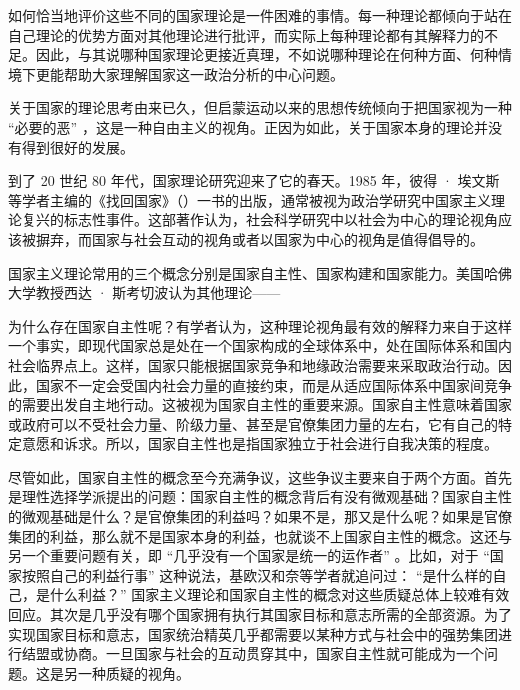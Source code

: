 如何恰当地评价这些不同的国家理论是一件困难的事情。每一种理论都倾向于站在自己理论的优势方面对其他理论进行批评，而实际上每种理论都有其解释力的不足。因此，与其说哪种国家理论更接近真理，不如说哪种理论在何种方面、何种情境下更能帮助大家理解国家这一政治分析的中心问题。


关于国家的理论思考由来已久，但启蒙运动以来的思想传统倾向于把国家视为一种 “必要的恶” ，这是一种自由主义的视角。正因为如此，关于国家本身的理论并没有得到很好的发展。

到了 20 世纪 80 年代，国家理论研究迎来了它的春天。1985 年，彼得 · 埃文斯等学者主编的《找回国家》（）一书的出版，通常被视为政治学研究中国家主义理论复兴的标志性事件。这部著作认为，社会科学研究中以社会为中心的理论视角应该被摒弃，而国家与社会互动的视角或者以国家为中心的视角是值得倡导的。

国家主义理论常用的三个概念分别是国家自主性、国家构建和国家能力。美国哈佛大学教授西达 · 斯考切波认为其他理论——


为什么存在国家自主性呢？有学者认为，这种理论视角最有效的解释力来自于这样一个事实，即现代国家总是处在一个国家构成的全球体系中，处在国际体系和国内社会临界点上。这样，国家只能根据国家竞争和地缘政治需要来采取政治行动。因此，国家不一定会受国内社会力量的直接约束，而是从适应国际体系中国家间竞争的需要出发自主地行动。这被视为国家自主性的重要来源。国家自主性意味着国家或政府可以不受社会力量、阶级力量、甚至是官僚集团力量的左右，它有自己的特定意愿和诉求。所以，国家自主性也是指国家独立于社会进行自我决策的程度。

尽管如此，国家自主性的概念至今充满争议，这些争议主要来自于两个方面。首先是理性选择学派提出的问题：国家自主性的概念背后有没有微观基础？国家自主性的微观基础是什么？是官僚集团的利益吗？如果不是，那又是什么呢？如果是官僚集团的利益，那么就不是国家本身的利益，也就谈不上国家自主性的概念。这还与另一个重要问题有关，即 “几乎没有一个国家是统一的运作者” 。比如，对于 “国家按照自己的利益行事” 这种说法，基欧汉和奈等学者就追问过： “是什么样的自己，是什么利益？” 国家主义理论和国家自主性的概念对这些质疑总体上较难有效回应。其次是几乎没有哪个国家拥有执行其国家目标和意志所需的全部资源。为了实现国家目标和意志，国家统治精英几乎都需要以某种方式与社会中的强势集团进行结盟或协商。一旦国家与社会的互动贯穿其中，国家自主性就可能成为一个问题。这是另一种质疑的视角。

